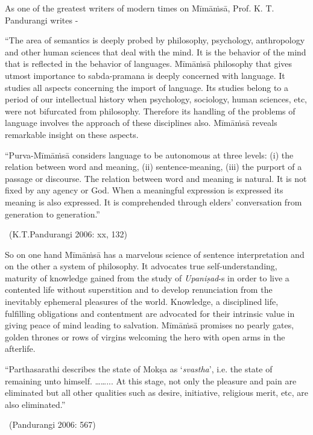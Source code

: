 As one of the greatest writers of modern times on Mīmāṁsā, Prof. K. T. Pandurangi writes -

\begin{myquote}
“The area of semantics is deeply probed by philosophy, psychology, anthropology and other human sciences that deal with the mind. It is the behavior of the mind that is reflected in the behavior of languages. Mīmāṁsā philosophy that gives utmost importance to sabda-pramana is deeply concerned with language. It studies all aspects concerning the import of language. Its studies belong to a period of our intellectual history when psychology, sociology, human sciences, etc, were not bifurcated from philosophy. Therefore its handling of the problems of language involves the approach of these disciplines also. Mīmāṁsā reveals remarkable insight on these aspects.
\end{myquote}

\begin{myquote}
“Purva-Mīmāṁsā considers language to be autonomous at three levels: (i) the relation between word and meaning, (ii) sentence-meaning, (iii) the purport of a passage or discourse. The relation between word and meaning is natural. It is not fixed by any agency or God. When a meaningful expression is expressed its meaning is also expressed. It is comprehended through elders’ conversation from generation to generation.” 

~\hfill (K.T.Pandurangi 2006: xx, 132)
\end{myquote}

So on one hand Mīmāṁsā has a marvelous science of sentence interpretation and on the other a system of philosophy. It advocates true self-understanding, maturity of knowledge gained from the study of \textit{Upaniṣad}-s in order to live a contented life without superstition and to develop renunciation from the inevitably ephemeral pleasures of the world. Knowledge, a disciplined life, fulfilling obligations and contentment are advocated for their intrinsic value in giving peace of mind leading to salvation. Mīmāṁsā promises no pearly gates, golden thrones or rows of virgins welcoming the hero with open arms in the afterlife.

\begin{myquote}
“Parthasarathi describes the state of Mokṣa as ‘\textit{svastha}’, i.e. the state of remaining unto himself. ……... At this stage, not only the pleasure and pain are eliminated but all other qualities such as desire, initiative, religious merit, etc, are also eliminated.” 

~\hfill (Pandurangi 2006: 567)
\end{myquote}


